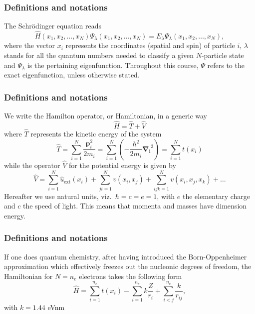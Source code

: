 \frame
{
  \frametitle{Definitions and notations}
\begin{small}
{\scriptsize
The Schr\"odinger equation reads 
\begin{equation}
\hat{H}(x_1, x_2, \dots , x_N) \Psi_{\lambda}(x_1, x_2, \dots , x_N) = 
E_\lambda  \Psi_\lambda(x_1, x_2, \dots , x_N), 
\label{eq:basicSE1}
\end{equation}
where the vector $x_i$ represents the coordinates (spatial and spin) of particle $i$, $\lambda$ stands  for all the quantum
numbers needed to classify a given $N$-particle state and $\Psi_{\lambda}$ is the pertaining eigenfunction.  Throughout this course,
$\Psi$ refers to the exact eigenfunction, unless otherwise stated.
}
\end{small}
}

\frame
{
  \frametitle{Definitions and notations}
\begin{small}
{\scriptsize
We write the Hamilton operator, or Hamiltonian,  in a generic way 
\[
	\hat{H} = \hat{T} + \hat{V} 
\]
where $\hat{T}$  represents the kinetic energy of the system
\[
	\hat{T} = \sum_{i=1}^N \frac{\mathbf{p}_i^2}{2m_i} = \sum_{i=1}^N \left( -\frac{\hbar^2}{2m_i} \mathbf{\nabla_i}^2 \right) =
		\sum_{i=1}^N t(x_i)
\]
while the operator $\hat{V}$ for the potential energy is given by
\begin{equation}
	\hat{V} = \sum_{i=1}^N \hat{u}_{\mathrm{ext}}(x_i) + \sum_{ji=1}^N v(x_i,x_j)+\sum_{ijk=1}^Nv(x_i,x_j,x_k)+\dots
\label{eq:firstv}
\end{equation}
Hereafter we use natural units, viz.~$\hbar=c=e=1$, with $e$ the elementary charge and $c$ the speed of light. This means that momenta and masses
have dimension energy. 
}
\end{small}
}
\frame
{
  \frametitle{Definitions and notations}
\begin{small}
{\scriptsize
If one does quantum chemistry, after having introduced the  Born-Oppenheimer approximation which effectively freezes out the nucleonic degrees
of freedom, the Hamiltonian for $N=n_e$ electrons takes the following form 
\[
  \hat{H} = \sum_{i=1}^{n_e} t(x_i) 
  - \sum_{i=1}^{n_e} k\frac{Z}{r_i} + \sum_{i<j}^{n_e} \frac{k}{r_{ij}},
\]
with $k=1.44$ eVnm
}
\end{small}
}

